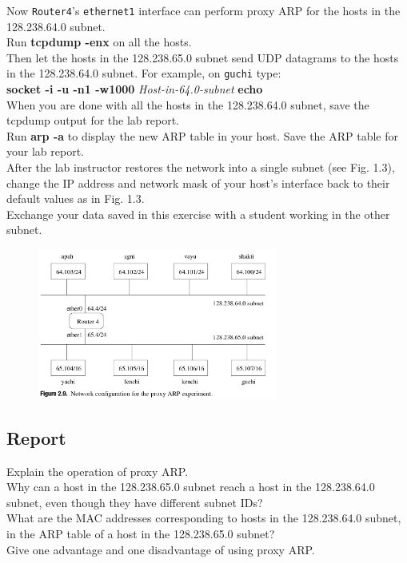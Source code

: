 \documentclass{../UTNetLab}
\begin{document}
    Now \texttt{Router4}’s \texttt{ethernet1} interface can perform proxy ARP for the hosts in the 128.238.64.0 subnet. \\
    Run \textbf{tcpdump -enx} on all the hosts. \\
    Then let the hosts in the 128.238.65.0 subnet send UDP datagrams to the hosts in the 128.238.64.0 subnet.
    For example, on \texttt{guchi} type: \\
    \textbf{socket -i -u -n1 -w1000} \textit{Host-in-64.0-subnet} \textbf{echo} \\
    When you are done with all the hosts in the 128.238.64.0 subnet, save the tcpdump output for the lab report. \\
    Run \textbf{arp -a} to display the new ARP table in your host.
    Save the ARP table for your lab report. \\
    After the lab instructor restores the network into a single subnet (see Fig. 1.3), change the IP address and network mask of your host’s interface back to their default values as in Fig. 1.3. \\
    Exchange your data saved in this exercise with a student working in the other subnet. \\
    \begin{figure}[H]
        \centering
        \includegraphics[width=0.7\textwidth]{img/figure2-9.png}
    \end{figure}
    \subsection*{Report}
    Explain the operation of proxy ARP. \\
    Why can a host in the 128.238.65.0 subnet reach a host in the 128.238.64.0 subnet, even though they have different subnet IDs? \\
    What are the MAC addresses corresponding to hosts in the 128.238.64.0 subnet, in the ARP table of a host in the 128.238.65.0 subnet? \\
    Give one advantage and one disadvantage of using proxy ARP.
\end{document}
